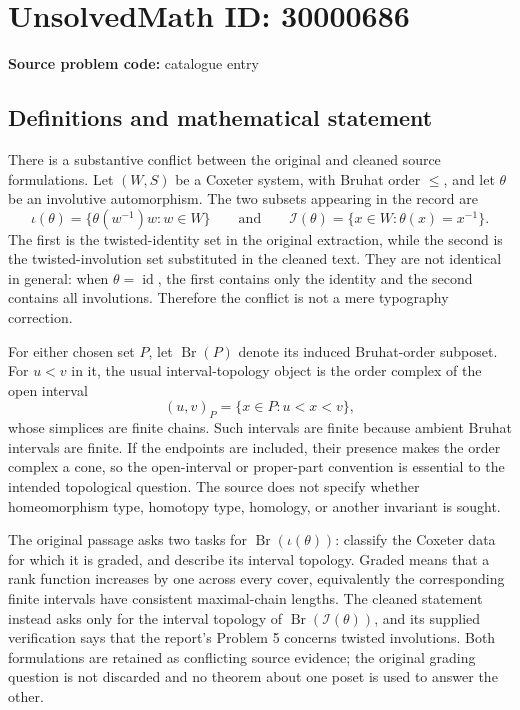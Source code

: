 \documentclass[11pt]{article}
\begin{document}
\section*{UnsolvedMath ID: 30000686}
\textbf{Source problem code:} catalogue entry
\subsection{Definitions and mathematical statement}
There is a substantive conflict between the original and cleaned source formulations. Let \((W,S)\) be a Coxeter system, with Bruhat order \(\leq\), and let \(\theta\) be an involutive automorphism. The two subsets appearing in the record are
\[
\iota(\theta)=\{\theta(w^{-1})w:w\in W\}
\qquad\text{and}\qquad
\mathcal I(\theta)=\{x\in W:\theta(x)=x^{-1}\}.
\]
The first is the twisted-identity set in the original extraction, while the second is the twisted-involution set substituted in the cleaned text. They are not identical in general: when \(\theta=\operatorname{id}\), the first contains only the identity and the second contains all involutions. Therefore the conflict is not a mere typography correction.

For either chosen set \(P\), let \(\operatorname{Br}(P)\) denote its induced Bruhat-order subposet. For \(u<v\) in it, the usual interval-topology object is the order complex of the open interval
\[
(u,v)_P=\{x\in P:u<x<v\},
\]
whose simplices are finite chains. Such intervals are finite because ambient Bruhat intervals are finite. If the endpoints are included, their presence makes the order complex a cone, so the open-interval or proper-part convention is essential to the intended topological question. The source does not specify whether homeomorphism type, homotopy type, homology, or another invariant is sought.

The original passage asks two tasks for \(\operatorname{Br}(\iota(\theta))\): classify the Coxeter data for which it is graded, and describe its interval topology. Graded means that a rank function increases by one across every cover, equivalently the corresponding finite intervals have consistent maximal-chain lengths. The cleaned statement instead asks only for the interval topology of \(\operatorname{Br}(\mathcal I(\theta))\), and its supplied verification says that the report's Problem 5 concerns twisted involutions. Both formulations are retained as conflicting source evidence; the original grading question is not discarded and no theorem about one poset is used to answer the other.
\end{document}
